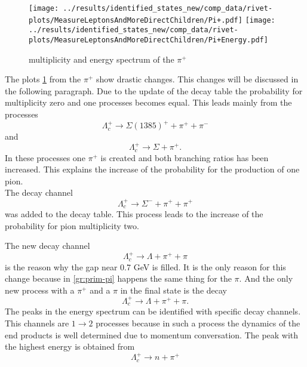 \begin{figure}[h]
  \centering
  \texttt{[image: ../results/identified\_states\_new/comp\_data/rivet-plots/MeasureLeptonsAndMoreDirectChildren/Pi+.pdf]}
  \texttt{[image: ../results/identified\_states\_new/comp\_data/rivet-plots/MeasureLeptonsAndMoreDirectChildren/Pi+Energy.pdf]}
  \caption{multiplicity and energy spectrum of the \(\pi^+\)} \label{gr:prim-pip}
\end{figure}
The plots {\ref{gr:prim-pip}} from the \(\pi^+\) show drastic changes. This 
changes will be discussed in the following paragraph. Due to the update of 
the decay table the probability for multiplicity zero and one processes
becomes equal. This leads mainly from the processes
\begin{equation}
  \Lambda_c^+ \rightarrow \Sigma(1385)^+ + \pi^+ + \pi^- \nonumber
\end{equation} and 
\begin{equation}
  \Lambda_c^+ \rightarrow \Sigma + \pi^+. \nonumber
\end{equation}
In these processes one \(\pi^+\) is created and both branching ratios has been increased. This explains the 
increase of the probability for the production of one pion.\\
The decay channel
\begin{equation}
  \Lambda_c^+ \rightarrow \Sigma^- + \pi^+ + \pi^+ \nonumber
\end{equation}
was added to the decay table. This process leads to the increase of the probability for 
pion multiplicity two.
\par
The new decay channel
\begin{equation}
  \Lambda_c^+ \rightarrow \Lambda + \pi^+ + \pi \nonumber
\end{equation}
is the reason why the gap near 0.7 GeV is filled. It is the only reason for this 
change because in {\ref{gr:prim-pi}} happens the same thing for the \(\pi\).
And the only new process with a \(\pi^+\) and a \(\pi\) in the final state 
is the decay
\begin{equation}
  \Lambda_c^+ \rightarrow \Lambda + \pi^+ + \pi. \nonumber
\end{equation}
The peaks in the energy spectrum can be identified with specific decay channels.
This channels are \( 1 \rightarrow 2 \) processes because in such a process the 
dynamics of the end products is well determined due to momentum conversation.
The peak with the highest energy is obtained from 
\begin{equation}
  \Lambda_c^+ \rightarrow n + \pi^+ \nonumber
\end{equation}
